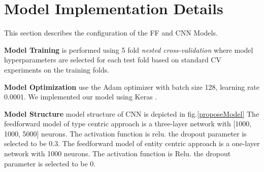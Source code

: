 \section{Model Implementation Details}
This section describes the configuration of the FF and CNN Models.

\textbf{Model Training} is performed using 5 fold \textit{nested cross-validation} \cite{cawley2010over} where model hyperparameters are selected for each test fold based on standard CV experiments on the training folds.

\textbf{Model Optimization} use the Adam optimizer with batch size 128, learning rate 0.0001. We implemented our model using Keras \cite{chollet2015keras}.

\textbf{Model Structure} model structure of CNN is depicted in fig.\ref{proposeModel} The feedforward model of type centric approach is a three-layer network with [1000, 1000, 5000] neurons. The activation function is relu. the dropout parameter is selected to be 0.3. The feedforward model of entity centric approach is a one-layer network with 1000 neurons. The activation function is Relu. the dropout parameter is selected to be 0.
